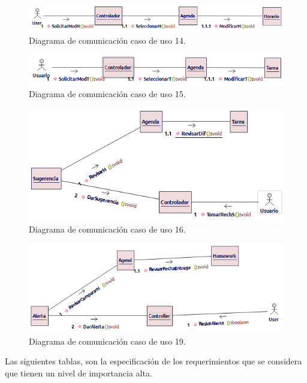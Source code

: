 \begin{figure}[H]
	\centering
	\includegraphics[width=0.7\linewidth]{diseno/requerimientos/imagenes/comunicacion1}
	\caption{Diagrama de comunicación caso de uso 14.}
	\label{fig:gantt}
\end{figure}
\begin{figure}[H]
	\centering
	\includegraphics[width=0.7\linewidth]{diseno/requerimientos/imagenes/comunicacion2}
	\caption{Diagrama de comunicación caso de uso 15.}
	\label{fig:gantt}
\end{figure}
\begin{figure}[H]
	\centering
	\includegraphics[width=0.7\linewidth]{diseno/requerimientos/imagenes/comunicacion3}
	\caption{Diagrama de comunicación caso de uso 16.}
	\label{fig:gantt}
\end{figure}
\begin{figure}[H]
	\centering
	\includegraphics[width=0.7\linewidth]{diseno/requerimientos/imagenes/comunicacion4}
	\caption{Diagrama de comunicación caso de uso 19.}
	\label{fig:gantt}
\end{figure}

Las siguientes tablas, son la especificación de los requerimientos que se considera que tienen un nivel de importancia alta.

 

